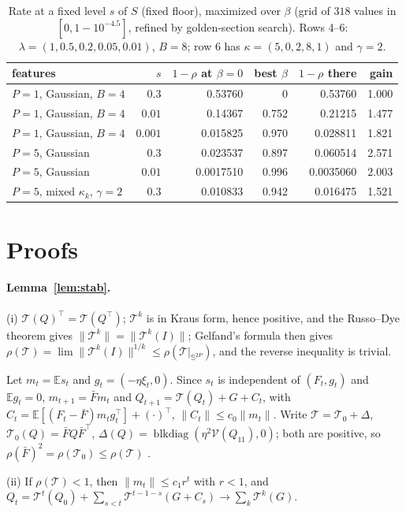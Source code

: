 \documentclass[11pt]{article}
\theoremstyle{remark}
\newcommand{\E}{\mathbb{E}}
\newcommand{\T}{\mathcal T}
\newcommand{\V}{\mathcal V}
\begin{document}
\begin{table}[!ht]
\centering
\caption{Rate at a fixed level $s$ of $S$ (fixed floor), maximized over $\beta$ (grid of $318$ values in $[0,1-10^{-4.5}]$, refined by golden-section search). Rows 4--6: $\lambda=(1,0.5,0.2,0.05,0.01)$, $B=8$; row 6 has $\kappa=(5,0,2,8,1)$ and $\gamma=2$.}
\label{tab:floor}
\smallskip
{\small\begin{tabular}{lrrrrr}
\toprule
features & $s$ & $1-\rho$ at $\beta=0$ & best $\beta$ & $1-\rho$ there & gain\\
\midrule
$P=1$, Gaussian, $B=4$ & $0.3$ & 0.53760 & 0 & 0.53760 & 1.000\\
$P=1$, Gaussian, $B=4$ & $0.01$ & 0.14367 & 0.752 & 0.21215 & 1.477\\
$P=1$, Gaussian, $B=4$ & $0.001$ & 0.015825 & 0.970 & 0.028811 & 1.821\\
$P=5$, Gaussian & $0.3$ & 0.023537 & 0.897 & 0.060514 & 2.571\\
$P=5$, Gaussian & $0.01$ & 0.0017510 & 0.996 & 0.0035060 & 2.003\\
$P=5$, mixed $\kappa_k$, $\gamma=2$ & $0.3$ & 0.010833 & 0.942 & 0.016475 & 1.521\\
\bottomrule
\end{tabular}}
\end{table}

\appendix
\section{Proofs}\label{app:proofs}

\paragraph{Lemma~\ref{lem:stab}.}
(i) $\T(Q)^\top=\T(Q^\top)$; $\T^k$ is in Kraus form, hence positive, and the Russo--Dye theorem gives $\|\T^k\|=\|\T^k(I)\|$; Gelfand's formula then gives $\rho(\T)=\lim\|\T^k(I)\|^{1/k}\le\rho(\T|_{\mathbb S^{2P}})$, and the reverse inequality is trivial.

Let $m_t=\E s_t$ and $g_t=(-\eta\xi_t,0)$. Since $s_t$ is independent of $(F_t,g_t)$ and $\E g_t=0$, $m_{t+1}=\bar Fm_t$ and $Q_{t+1}=\T(Q_t)+G+C_t$, with $C_t=\E[(F_t-\bar F)m_tg_t^\top]+(\cdot)^\top$, $\|C_t\|\le c_0\|m_t\|$. Write $\T=\T_0+\Delta$, $\T_0(Q)=\bar FQ\bar F^\top$, $\Delta(Q)=\operatorname{blkdiag}(\eta^2\V(Q_{11}),0)$; both are positive, so $\rho(\bar F)^2=\rho(\T_0)\le\rho(\T)$ \citep{berman1994}.

(ii) If $\rho(\T)<1$, then $\|m_t\|\le c_1r^t$ with $r<1$, and $Q_t=\T^t(Q_0)+\sum_{s<t}\T^{t-1-s}(G+C_s)\to\sum_k\T^k(G)$.
\end{document}
